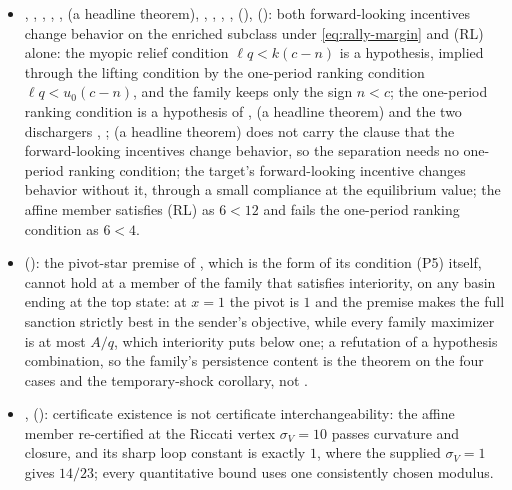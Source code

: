 \begin{itemize}[leftmargin=1.4em,itemsep=1pt]
\item {}, , , , ,  (a headline theorem), , , , ,  (),  (): both forward-looking incentives change behavior on the enriched subclass under \eqref{eq:rally-margin} and \textup{(RL)} alone: the myopic relief condition $\ell q<k(c-n)$ is a hypothesis, implied through the lifting condition by the one-period ranking condition $\ell q<u_0(c-n)$, and the family keeps only the sign $n<c$; the one-period ranking condition is a hypothesis of ,  (a headline theorem) and the two dischargers , ;  (a headline theorem) does not carry the clause that the forward-looking incentives change behavior, so the separation needs no one-period ranking condition; the target's forward-looking incentive changes behavior without it, through a small compliance at the equilibrium value; the affine member  satisfies (RL) as $6<12$ and fails the one-period ranking condition as $6<4$.
\item {} (): the pivot-star premise of , which is the form of its condition (P5) itself, cannot hold at a member of the family that satisfies interiority, on any basin ending at the top state: at $x=1$ the pivot is $1$ and the premise makes the full sanction strictly best in the sender's objective, while every family maximizer is at most $A/q$, which interiority puts below one; a refutation of a hypothesis combination, so the family's persistence content is the theorem on the four cases and the temporary-shock corollary, not .
\item {},  (): certificate existence is not certificate interchangeability: the affine member re-certified at the Riccati vertex $\sigma_V=10$ passes curvature and closure, and its sharp loop constant is exactly $1$, where the supplied $\sigma_V=1$ gives $14/23$; every quantitative bound uses one consistently chosen modulus.

\end{itemize}
